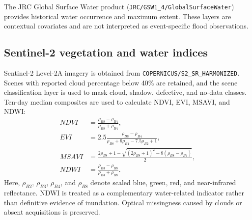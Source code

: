 \documentclass[pdflatex,sn-mathphys,Numbered]{sn-jnl}
\begin{document}
The JRC Global Surface Water product (\texttt{JRC/GSW1\_4/GlobalSurfaceWater}) provides historical water occurrence and maximum extent. These layers are contextual covariates and are not interpreted as event-specific flood observations.

\subsection{Sentinel-2 vegetation and water indices}
Sentinel-2 Level-2A imagery is obtained from \texttt{COPERNICUS/S2\_SR\_HARMONIZED}. Scenes with reported cloud percentage below 40\% are retained, and the scene classification layer is used to mask cloud, shadow, defective, and no-data classes. Ten-day median composites are used to calculate NDVI, EVI, MSAVI, and NDWI:
\begin{align}
NDVI &= \frac{\rho_{B8}-\rho_{B4}}{\rho_{B8}+\rho_{B4}},\\
EVI &= 2.5\frac{\rho_{B8}-\rho_{B4}}{\rho_{B8}+6\rho_{B4}-7.5\rho_{B2}+1},\\
MSAVI &= \frac{2\rho_{B8}+1-\sqrt{(2\rho_{B8}+1)^2-8(\rho_{B8}-\rho_{B4})}}{2},\\
NDWI &= \frac{\rho_{B3}-\rho_{B8}}{\rho_{B3}+\rho_{B8}}.
\end{align}
Here, $\rho_{B2}$, $\rho_{B3}$, $\rho_{B4}$, and $\rho_{B8}$ denote scaled blue, green, red, and near-infrared reflectance. NDWI is treated as a complementary water-related indicator rather than definitive evidence of inundation. Optical missingness caused by clouds or absent acquisitions is preserved.
\end{document}
